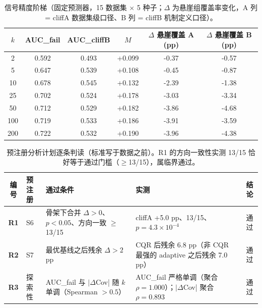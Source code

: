 \documentclass[UTF8, 11pt, a4paper]{ctexart}
\begin{document}
\begin{table}[htbp]
  \centering
  \caption{信号精度阶梯（固定预测器，15 数据集 $\times$ 5 种子；$\Delta$ 为悬崖组覆盖率变化，A 列 = cliffA 数据集级口径、B 列 = cliffB 机制定义口径）。}
  \label{tab:kablation}
  \begin{tabular}{@{} S[table-format=3.0] S[table-format=1.3] S[table-format=1.3] S[table-format=1.3] S[table-format=1.2] S[table-format=1.2] @{}}
    \toprule
    {$k$} & {AUC\_fail} & {AUC\_cliffB} & {$M$} & {$\Delta$ 悬崖覆盖 A (pp)} & {$\Delta$ 悬崖覆盖 B (pp)} \\
       & 0.592 & 0.493 & +0.099 & -0.37 & -0.57 \\
    5   & 0.647 & 0.539 & +0.108 & -0.45 & -0.87 \\
    10  & 0.678 & 0.545 & +0.132 & -2.39 & -1.38 \\
    25  & 0.702 & 0.524 & +0.178 & -3.03 & -3.34 \\
    50  & 0.712 & 0.529 & +0.182 & -3.86 & -4.68 \\
    100 & 0.719 & 0.533 & +0.186 & -3.91 & -3.59 \\
    200 & 0.722 & 0.532 & +0.190 & -3.96 & -4.38 \\
    \bottomrule
  \end{tabular}
\end{table}

\begin{table}[htbp]
  \centering
  \caption{预注册分析计划逐条判读（标准写于数据之前）。R1 的方向一致性实测 13/15 恰好等于通过门槛（$\geq$13/15），属临界通过。}
  \label{tab:prereg}
  \begin{tabularx}{\textwidth}{@{} c l X X c @{}}
    \toprule
    编号 & 预注册 & 通过条件 & 实测 & 结论 \\
    \midrule
    \textbf{R1} & S6 & 骨架下合并 $\Delta>0$、$p<0.05$、方向一致 $\geq$13/15 & cliffA +5.0 pp、13/15、$p = 4.3\times10^{-4}$ & 通过 \\
    \textbf{R2} & S7 & 最优基线之后残余 $\Delta>2$ pp & CQR 后残余 6.8 pp（非 CQR 最强的 adaptive 之后残余 7.0 pp） & 通过 \\
    \textbf{R3} & 探索性 & AUC\_fail 与 $|\Delta$Cov| 随 $k$ 单调（Spearman $>0.5$） & AUC\_fail 严格单调（聚合 $\rho = 1.000$）；$|\Delta$Cov| 聚合 $\rho = 0.893$ & 通过 \\
    \bottomrule
  \end{tabularx}
\end{table}
\end{document}

